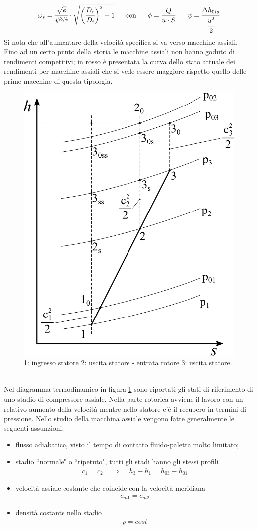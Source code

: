 \begin{align*}
\omega_s = \cfrac{\sqrt{\phi}}{\psi^{3/4}} \cdot \sqrt{\bigg( \cfrac{D_e}{D_i} \bigg)^2 -1} \;\;\;\;\;\; \text{con} \;\;\;\;\;\; \phi = \frac{Q}{u \cdot S} \;\;\;\;\;\; \psi = \cfrac{\Delta h_{0is}}{\cfrac{u^2}{2}}
\end{align*}
Si nota che all'aumentare della velocità specifica si va verso macchine assiali.\\
Fino ad un certo punto della storia le macchine assiali non hanno goduto di rendimenti competitivi; in rosso è presentata la curva dello stato attuale dei rendimenti per macchine assiali che si vede essere maggiore rispetto quello delle prime macchine di questa tipologia. 
\begin{figure}
\centering
  \includegraphics[width=.4\textwidth]{fig/hsComp.pdf}
\caption{1: ingresso statore 2: uscita statore - entrata rotore 3: uscita statore.}
\label{fig:hsComp}
\end{figure}
\\Nel diagramma termodinamico in figura \ref{fig:hsComp} sono riportati gli stati di riferimento di uno stadio di compressore assiale. Nella parte rotorica avviene il lavoro con un relativo aumento della velocità mentre nello statore c'è il recupero in termini di pressione. Nello studio della macchina assiale vengono fatte generalmente le seguenti assunzioni:
\begin{itemize}
\item flusso adiabatico, visto il tempo di contatto fluido-paletta molto limitato;
\item stadio ``normale" o ``ripetuto", tutti gli stadi hanno gli stessi profili
\begin{align*}
c_1 = c_2 \;\;\;\; \Rightarrow \;\;\;\; h_3-h_1 = h_{03} - h_{01}
\end{align*}
\item velocità assiale costante che coincide con la velocità meridiana
\begin{align*}
c_{m1} = c_{m2}
\end{align*}
\item densità costante nello stadio
\begin{align*}
\rho = cost
\end{align*}
\end{itemize}
